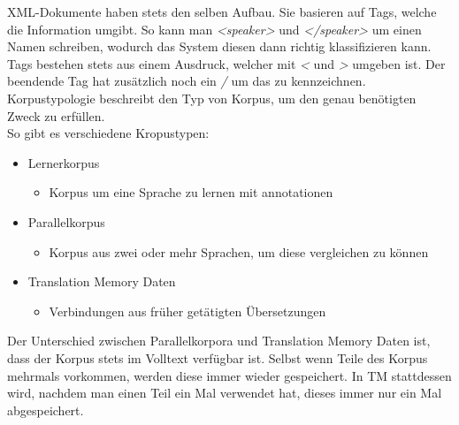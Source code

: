 \documentclass{article}
\begin{document}
	XML-Dokumente haben stets den selben Aufbau. Sie basieren auf Tags, welche die Information umgibt. So kann man \textit{<speaker>} und \textit{</speaker>} um einen Namen schreiben, wodurch das System diesen dann richtig klassifizieren kann. Tags bestehen stets aus einem Ausdruck, welcher mit \textit{<} und \textit{>} umgeben ist. Der beendende Tag hat zusätzlich noch ein \textit{/} um das zu kennzeichnen. \\

	Korpustypologie beschreibt den Typ von Korpus, um den genau benötigten Zweck zu erfüllen. \\
	So gibt es verschiedene Kropustypen:
	\begin{itemize}
		\item{Lernerkorpus}
		\begin{itemize}
			\item{Korpus um eine Sprache zu lernen mit annotationen}
		\end{itemize}
		\item{Parallelkorpus}
		\begin{itemize}
			\item{Korpus aus zwei oder mehr Sprachen, um diese vergleichen zu können}
		\end{itemize}
		\item{Translation Memory Daten}
		\begin{itemize}
			\item{Verbindungen aus früher getätigten Übersetzungen}
		\end{itemize}
	\end{itemize}

	Der Unterschied zwischen Parallelkorpora und Translation Memory Daten ist, dass der Korpus stets im Volltext verfügbar ist. Selbst wenn Teile des Korpus mehrmals vorkommen, werden diese immer wieder gespeichert. In TM stattdessen wird, nachdem man einen Teil ein Mal verwendet hat, dieses immer nur ein Mal abgespeichert. \\
	
	

	
	


	
\end{document}
